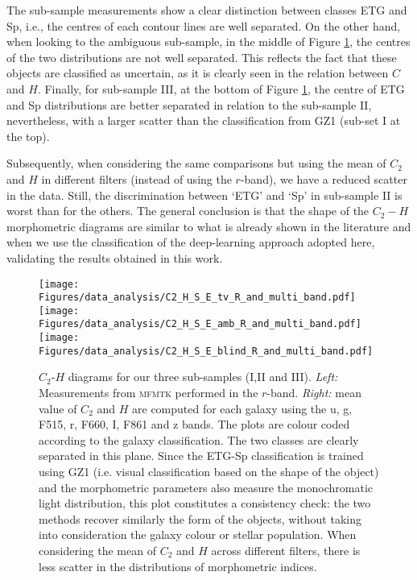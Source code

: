 \documentclass[fleqn,usenatbib]{mnras}
\begin{document}
The sub-sample measurements show a clear distinction between classes ETG and Sp, i.e., the centres of each contour lines are well separated. On the other hand, when looking to the ambiguous sub-sample, in the middle of Figure \ref{fig:scatter_C2_H_S_E_all_sample}, the centres of the two distributions are not well separated. This reflects the fact that these objects are classified as uncertain, as it is clearly seen in the relation between $C$ and $H$. Finally, for sub-sample III, at the bottom of Figure \ref{fig:scatter_C2_H_S_E_all_sample}, the centre of ETG and Sp distributions are better separated in relation to the sub-sample II, nevertheless, with a larger scatter than the classification from GZ1 (sub-set I at the top). 

Subsequently, when considering the same comparisons but using the mean of $C_2$ and $H$ in different filters (instead of using the $r$-band), we have a reduced scatter in the data. Still, the discrimination between `ETG' and `Sp' in sub-sample II is worst than for the others. 
The general conclusion is that the shape of the $C_2-H$ morphometric diagrams are similar to what is already shown in the literature \citep{Ferrari_2015, conselice2014} and when we use the classification of the deep-learning approach adopted here,  validating the results obtained in this work.




\begin{figure}
\centering
\texttt{[image: Figures/data\_analysis/C2\_H\_S\_E\_tv\_R\_and\_multi\_band.pdf]}
\texttt{[image: Figures/data\_analysis/C2\_H\_S\_E\_amb\_R\_and\_multi\_band.pdf]}
\texttt{[image: Figures/data\_analysis/C2\_H\_S\_E\_blind\_R\_and\_multi\_band.pdf]}
    \caption{
    \label{fig:scatter_C2_H_S_E_all_sample}
    $C_2$-$H$ diagrams for our three sub-samples (I,II and III). 
   {\it Left:} Measurements from \textsc{mfmtk} performed in the $r$-band. 
   {\it Right:} mean value of $C_2$ and $H$ are computed for each galaxy using the u, g, F515, r, F660, I, F861 and z bands. The plots are colour coded according to the galaxy classification. 
   The two classes are clearly separated in this plane. Since the ETG-Sp classification is trained using GZ1 (i.e. visual classification based on the shape of the object) and the morphometric parameters also measure the monochromatic light distribution, this plot constitutes a consistency check: the two methods recover similarly the form of the objects, without taking into consideration the galaxy colour or stellar population.
   When considering the mean of $C_2$ and $H$ across different filters, there is less scatter in the distributions of morphometric indices.
   }
\end{figure}
\end{document}
